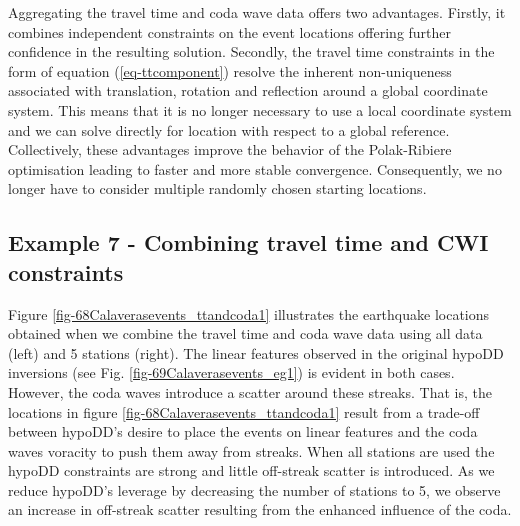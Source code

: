\documentclass[extra]{gji}
\begin{document}
Aggregating the travel time and coda wave data offers two
advantages. Firstly, it combines independent constraints on the
event locations offering further confidence in the resulting
solution. Secondly, the travel time constraints in the form of
equation (\ref{eq-ttcomponent}) resolve the inherent non-uniqueness
associated with translation, rotation and reflection around a global
coordinate system. This means that it is no longer necessary to use
a local coordinate system and we can solve directly for location
with respect to a global reference. Collectively, these advantages
improve the behavior of the Polak-Ribiere optimisation leading to
faster and more stable convergence. Consequently, we no longer have
to consider multiple randomly chosen starting locations.


\subsection{Example 7 - Combining travel time and CWI constraints}
 Figure
\ref{fig-68Calaverasevents_ttandcoda1} illustrates the earthquake
locations obtained when we combine the travel time and coda wave
data using all data (left) and 5 stations (right). The linear
features observed in the original hypoDD inversions (see Fig.
\ref{fig-69Calaverasevents_eg1}) is evident in both cases. However,
the coda waves introduce a scatter around these streaks. That is,
the locations in figure \ref{fig-68Calaverasevents_ttandcoda1}
result from a trade-off between hypoDD's desire to place the events
on linear features and the coda waves voracity to push them away
from streaks. When all stations are used the hypoDD constraints are
strong and little off-streak scatter is introduced. As we reduce
hypoDD's leverage by decreasing the number of stations to 5, we
observe an increase in off-streak scatter resulting from the
enhanced influence of the coda.

\end{document}
